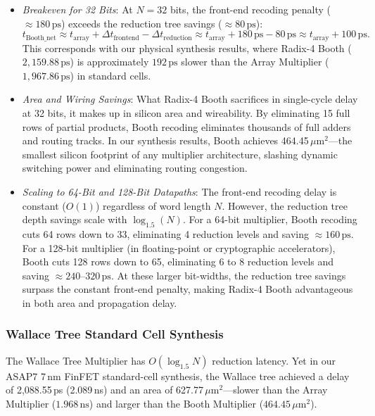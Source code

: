 \begin{itemize}
    \item \textit{Breakeven for 32 Bits}: At $N = 32$ bits, the front-end recoding penalty ($\approx 180\,\text{ps}$) exceeds the reduction tree savings ($\approx 80\,\text{ps}$):
    \begin{equation}
    t_{\text{Booth\_net}} \approx t_{\text{array}} + \Delta t_{\text{frontend}} - \Delta t_{\text{reduction}} \approx t_{\text{array}} + 180\,\text{ps} - 80\,\text{ps} \approx t_{\text{array}} + 100\,\text{ps}.
    \end{equation}
    This corresponds with our physical synthesis results, where Radix-4 Booth ($2,159.88\,\text{ps}$) is approximately $192\,\text{ps}$ slower than the Array Multiplier ($1,967.86\,\text{ps}$) in standard cells.
    
    \item \textit{Area and Wiring Savings}: What Radix-4 Booth sacrifices in single-cycle delay at 32 bits, it makes up in silicon area and wireability. By eliminating 15 full rows of partial products, Booth recoding eliminates thousands of full adders and routing tracks. In our synthesis results, Booth achieves 464.45\,$\mu$m$^2$---the smallest silicon footprint of any multiplier architecture, slashing dynamic switching power and eliminating routing congestion.
    
    \item \textit{Scaling to 64-Bit and 128-Bit Datapaths}: The front-end recoding delay is constant ($O(1)$) regardless of word length $N$. However, the reduction tree depth savings scale with $\log_{1.5}(N)$. For a 64-bit multiplier, Booth recoding cuts 64 rows down to 33, eliminating 4 reduction levels and saving $\approx 160\,\text{ps}$. For a 128-bit multiplier (in floating-point or cryptographic accelerators), Booth cuts 128 rows down to 65, eliminating 6 to 8 reduction levels and saving $\approx 240\text{--}320\,\text{ps}$. At these larger bit-widths, the reduction tree savings surpass the constant front-end penalty, making Radix-4 Booth advantageous in both area and propagation delay.
\end{itemize}

\subsubsection{Wallace Tree Standard Cell Synthesis}

The Wallace Tree Multiplier has $O(\log_{1.5} N)$ reduction latency. Yet in our ASAP7 7\,nm FinFET standard-cell synthesis, the Wallace tree achieved a delay of 2,088.55\,ps (2.089\,ns) and an area of 627.77\,$\mu$m$^2$---slower than the Array Multiplier ($1.968\,\text{ns}$) and larger than the Booth Multiplier ($464.45\,\mu\text{m}^2$).

